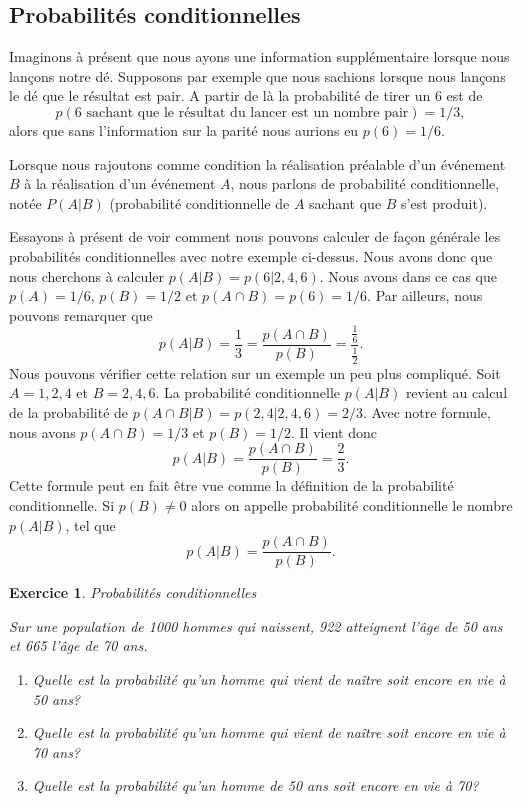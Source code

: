 \documentclass[a4paper,12pt]{book}
\newtheorem*{exercice}{Exercice}
\begin{document}
\subsection{Probabilités conditionnelles}

Imaginons à présent que nous ayons une information supplémentaire lorsque nous lançons notre dé. 
Supposons par exemple que nous sachions lorsque nous lançons le dé que le résultat est pair. A partir de là
la probabilité de tirer un $6$ est de 
\begin{equation}
p(6\mbox{ sachant que le résultat du lancer est un nombre pair})=1/3,
\end{equation}
alors que sans l'information sur la parité nous aurions eu $p(6)=1/6$.

Lorsque nous rajoutons comme condition la réalisation préalable d'un événement $B$ à la réalisation d'un événement $A$,
nous parlons de probabilité conditionnelle, notée $P(A|B)$ (probabilité conditionnelle de $A$ sachant que $B$ s'est produit).

Essayons à présent de voir comment nous pouvons calculer de façon générale les probabilités conditionnelles avec notre exemple ci-dessus.
Nous avons donc que nous cherchons à calculer $p(A|B)=p(6|{2,4,6})$. Nous avons dans ce cas que $p(A)=1/6$, $p(B)=1/2$ et $p(A\cap B)=p(6)=1/6$.
Par ailleurs, nous pouvons remarquer que 
\begin{equation}
 p(A|B)=\frac{1}{3}=\frac{p(A\cap B)}{p(B)}=\frac{\frac{1}{6}}{\frac{1}{2}}.
\end{equation}
Nous pouvons vérifier cette relation sur un exemple un peu plus compliqué. Soit $A={1,2,4}$ et $B={2,4,6}$. La probabilité conditionnelle
$p(A|B)$ revient au calcul de la probabilité de $p(A\cap B|B)=p({2,4}|{2,4,6})=2/3$. Avec notre formule, nous avons
$p(A\cap B)=1/3$ et $p(B)=1/2$. Il vient donc
\begin{equation}
 p(A|B)=\frac{p(A\cap B)}{p(B)}=\frac{2}{3}.
\end{equation}
Cette formule peut en fait être vue comme la définition de la probabilité conditionnelle. 
Si $p(B)\neq0$ alors on appelle probabilité conditionnelle le nombre $p(A|B)$, tel que
\begin{equation}
 p(A|B)=\frac{p(A\cap B)}{p(B)}.
\end{equation}

\begin{exercice}{Probabilités conditionnelles}

Sur une population de 1000 hommes qui naissent, 922 atteignent l'âge de 50 ans et 665 l'âge de 70 ans. 
\begin{enumerate}
\item Quelle est la probabilité qu'un homme qui vient de naître soit encore en vie à 50 ans?
\item Quelle est la probabilité qu'un homme qui vient de naître soit encore en vie à 70 ans?
\item Quelle est la probabilité qu'un homme de 50 ans soit encore en vie à 70?
\end{enumerate}
\end{exercice}
\end{document}
